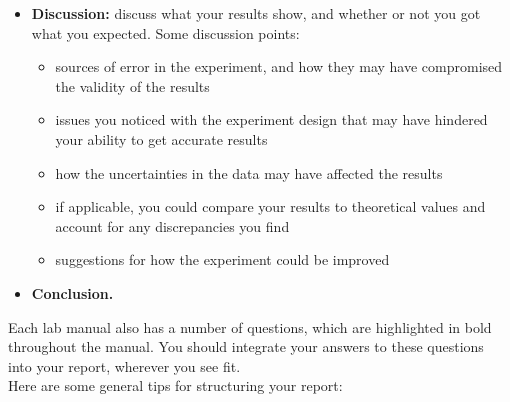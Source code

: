 \documentclass[11pt]{extarticle}
\begin{document}
\begin{itemize}
	\item {\bf Discussion:} discuss what your results show, and whether or not you got what you expected. Some discussion points:
		\begin{itemize}
			\item sources of error in the experiment, and how they may have compromised the validity of the results 
			\item issues you noticed with the experiment design that may have hindered your ability to get accurate results 
			\item how the uncertainties in the data may have affected the results 
			\item if applicable, you could compare your results to theoretical values and account for any discrepancies you find 
			\item suggestions for how the experiment could be improved 
		\end{itemize}

	\item {\bf Conclusion.} 
\end{itemize}

\hfill 

Each lab manual also has a number of questions, which are highlighted in bold throughout the manual. You should integrate your answers to these questions into your report, wherever you see fit. \\ 

Here are some general tips for structuring your report:

\hfill 
\end{document}
